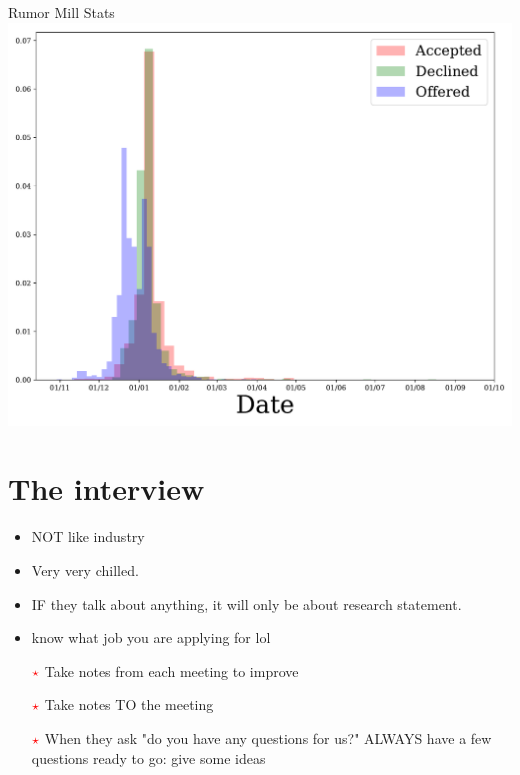\documentclass[10pt]{beamer}
\begin{document}
\begin{frame}{Rumor Mill Stats}
\includegraphics[width=\textwidth]{../Distribution.pdf}
\end{frame}

\section{The interview}
\begin{frame}
\begin{itemize}
	\item NOT like industry
	\item Very very chilled.
	\item IF they talk about anything, it will only be about research statement. 
	\item know what job you are applying for lol
	\item [{$\color{red}\star$}] Take notes from each meeting to improve
	\item [{$\color{red}\star$}] Take notes TO the meeting
	\item [{$\color{red}\star$}] When they ask "do you have any questions for us?" ALWAYS have a few questions ready to go: give some ideas
\end{itemize}

\end{frame}
\end{document}
